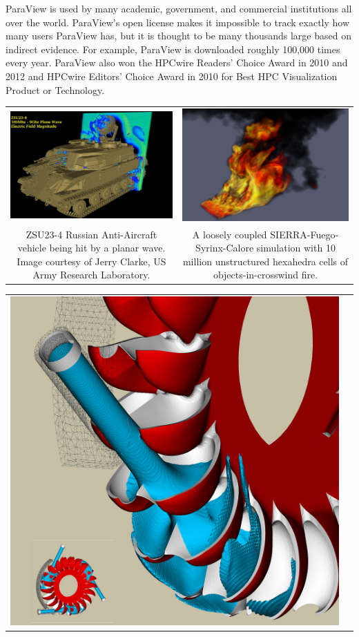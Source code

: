 ParaView is used by many academic, government, and commercial institutions
all over the world.  ParaView's open license makes it impossible to track
exactly how many users ParaView has, but it is thought to be many thousands
large based on indirect evidence.  For example, ParaView is downloaded
roughly 100,000 times every year.  ParaView also won the HPCwire Readers'
Choice Award in 2010 and 2012 and HPCwire Editors' Choice Award in 2010 for
Best HPC Visualization Product or Technology.

\begin{inlinefig}
  \begin{tabular}{cc}
    \includegraphics[width=.457\linewidth]{images/Tank} &
    \includegraphics[width=0.443\linewidth]{images/Fire} \\
    \parbox[t]{.457\linewidth}{\footnotesize ZSU23-4 Russian Anti-Aircraft
      vehicle being hit by a planar wave.  Image courtesy of Jerry Clarke,
      US Army Research Laboratory.} &
    \parbox[t]{0.443\linewidth}{\footnotesize A loosely coupled
      SIERRA-Fuego-Syrinx-Calore simulation with 10 million unstructured
      hexahedra cells of objects-in-crosswind fire.}
  \end{tabular}
  \begin{tabular}{cc}
    \includegraphics[width=.29\linewidth]{images/PeltonTurbine} &

\end{tabular}
\end{inlinefig}

